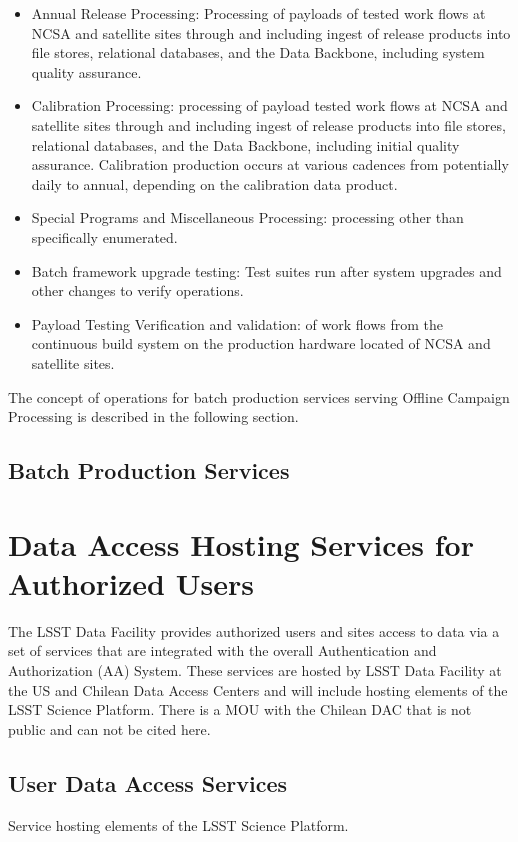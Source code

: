 \begin{itemize}
\item  Annual Release Processing: Processing of payloads of tested work flows at
NCSA and satellite sites through and including ingest of release products into
file stores, relational databases, and the Data Backbone, including system
quality assurance.
\item  Calibration Processing: processing of payload tested work flows at NCSA
and satellite sites through and including ingest of release products into file
stores, relational databases, and the Data Backbone, including initial quality
assurance. Calibration production occurs at various cadences from potentially
daily to annual, depending on the calibration data product.
\item  Special Programs and Miscellaneous Processing: processing other than
specifically enumerated.
\item  Batch framework upgrade testing: Test suites run after system upgrades
and other changes to verify operations.
\item  Payload Testing Verification and validation: of work flows from the
continuous build system on the production hardware located of NCSA and satellite
sites.
\end{itemize}

The concept of operations for batch production services serving Offline Campaign
Processing is described in the following section.

\subsection{Batch Production Services}


\section{Data Access Hosting Services for Authorized Users}
The LSST Data Facility provides authorized users and sites access to data via a
set of services that are integrated with the overall Authentication and
Authorization (AA) System. These services are hosted by LSST Data Facility at
the US and Chilean Data Access Centers and will include hosting elements of the
LSST Science Platform. There is a MOU with the Chilean DAC that is not public and can not be cited here.   

\subsection{User Data Access Services}
Service hosting elements of the LSST Science Platform.


